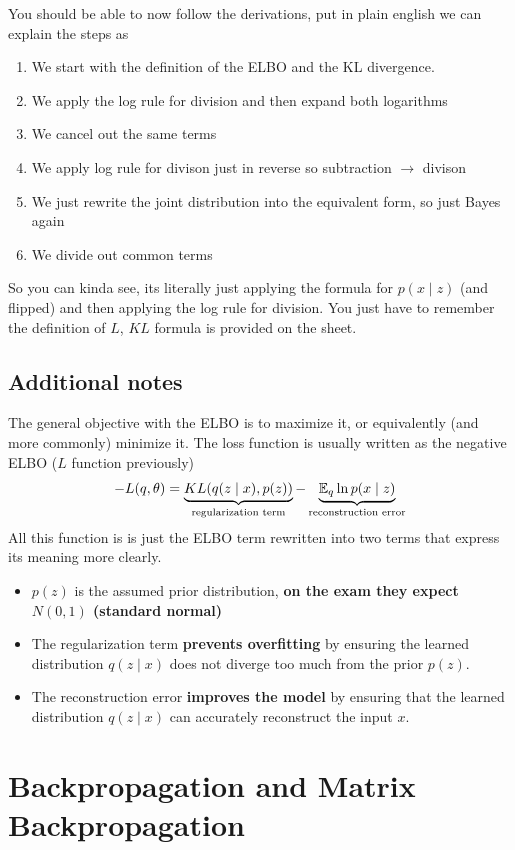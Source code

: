 \documentclass[12pt]{article}
\begin{document}
You should be able to now follow the derivations, put in plain english we can explain the steps as 
\begin{enumerate}[leftmargin=*, noitemsep]
    \item We start with the definition of the ELBO and the KL divergence.
    \item We apply the log rule for division and then expand both logarithms 
    \item We cancel out the same terms 
    \item We apply log rule for divison just in reverse so subtraction $\rightarrow$ divison
    \item We just rewrite the joint distribution into the equivalent form, so just Bayes again
    \item We divide out common terms 
\end{enumerate}

So you can kinda see, its literally just applying the formula for $p(x\mid z)$ (and flipped) and then applying the log rule for division. You just have to remember the definition of $L$, $KL$ formula is provided on the sheet.
\subsection{Additional notes}
The general objective with the ELBO is to maximize it, or equivalently (and more commonly) minimize it. The loss function is usually written as the negative ELBO ($L$ function previously)
\[
    -L(q, \theta) = \underbrace{KL(q(z\mid x), p(z))}_{\text{regularization term}} - \underbrace{\operatorname{\mathbb{E}}_q\ln p(x\mid z)}_{\text{reconstruction error}}
\]
All this function is is just the ELBO term rewritten into two terms that express its meaning more clearly.
\begin{itemize}[leftmargin=*, noitemsep]
    \item $p(z)$ is the assumed prior distribution, \textbf{on the exam they expect $N(0, 1)$ (standard normal)}
    \item The regularization term \textbf{prevents overfitting} by ensuring the learned distribution $q(z\mid x)$ does not diverge too much from the prior $p(z)$.
    \item The reconstruction error \textbf{improves the model} by ensuring that the learned distribution $q(z\mid x)$ can accurately reconstruct the input $x$.
\end{itemize}

\section{Backpropagation and Matrix Backpropagation}
\end{document}
